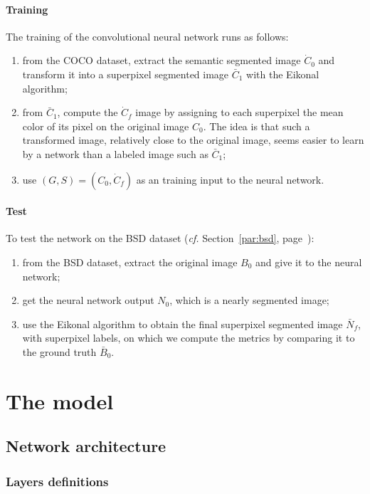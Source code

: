 \documentclass{article}
\begin{document}
        \paragraph{Training}
        The training of the convolutional neural network runs as follows:
        \begin{enumerate}
            \item from the COCO dataset, extract the semantic segmented image $\dot C_0$ and transform it into a superpixel segmented image $\bar C_1$ with the Eikonal algorithm;
            \item from $\bar C_1$, compute the $\dot C_f$ image by assigning to each superpixel the mean color of its pixel on the original image $C_0$. The idea is that such a transformed image, relatively close to the original image, seems easier to learn by a network than a labeled image such as $\bar C_1$;
            \item use $(G,S)=(C_0, \dot C_f)$ as an training input to the neural network.
        \end{enumerate}
        \paragraph{Test}
        To test the network on the BSD dataset (\textit{cf.} Section~\ref{par:bsd}, page~\pageref{par:bsd}):
        \begin{enumerate}
            \item from the BSD dataset, extract the original image $B_0$ and give it to the neural network;
            \item get the neural network output $N_0$, which is a nearly segmented image;
            \item use the Eikonal algorithm to obtain the final superpixel segmented image $\bar N_f$, with superpixel labels, on which we compute the metrics by comparing it to the ground truth $\bar B_0$.
        \end{enumerate}



\section{The model}
    \subsection{Network architecture}
        \subsubsection{Layers definitions}
\end{document}
